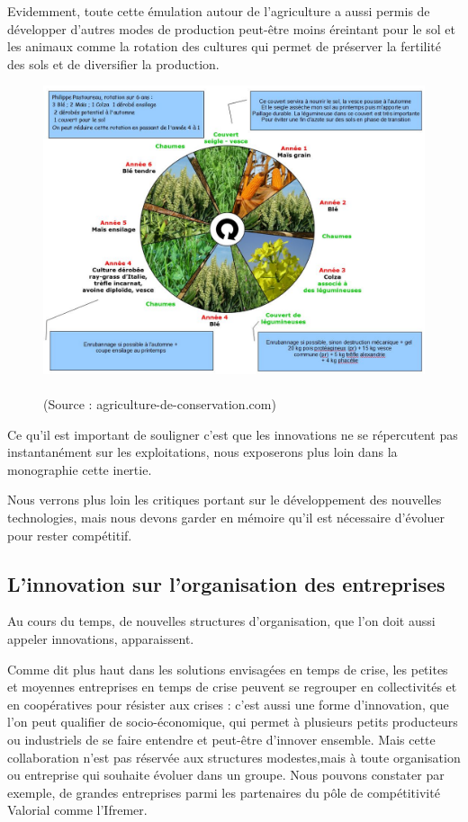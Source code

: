 \documentclass[a4paper,12pt]{report}
\begin{document}
			Evidemment, toute cette émulation autour de l’agriculture a aussi permis de développer d’autres modes de production peut-être moins éreintant pour le sol et les animaux comme la rotation des cultures qui permet de préserver la fertilité des sols et de diversifier la production.
			
			\begin{figure}[!h]
			\centering
			\includegraphics[scale=0.6]{Illustrations/Rotation.jpg}
			\caption{\\(Source : agriculture-de-conservation.com\cite{RotationSite})}
			\label{Rotation}
			\end{figure}
			
			Ce qu'il est important de souligner c’est que les innovations ne se répercutent pas instantanément sur les exploitations, nous exposerons plus loin dans la monographie cette inertie.
			
			Nous verrons plus loin les critiques portant sur le développement des nouvelles technologies, mais nous devons garder en mémoire qu’il est nécessaire d’évoluer pour rester compétitif.
			
			
		\subsection{L'innovation sur l'organisation des entreprises}
			Au cours du temps, de nouvelles structures d’organisation, que l’on doit aussi appeler innovations, apparaissent.
			
			Comme dit plus haut dans les solutions envisagées en temps de crise, les petites et moyennes entreprises en temps de crise peuvent se regrouper en collectivités et en coopératives pour résister aux crises : c’est aussi une forme d’innovation, que l’on peut qualifier de socio-économique, qui permet à plusieurs petits producteurs ou industriels de se faire entendre et peut-être d’innover ensemble. 
			Mais cette collaboration n’est pas réservée aux structures modestes,mais à toute organisation ou entreprise qui souhaite évoluer dans un groupe. Nous pouvons constater par exemple, de grandes entreprises parmi les partenaires du pôle de compétitivité Valorial comme l’Ifremer.
			
\end{document}
